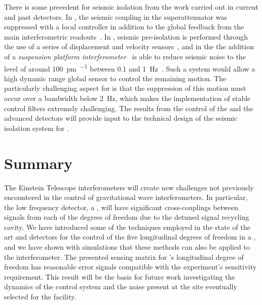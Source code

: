 There is some precedent for seismic isolation from the work carried out in current and past detectors. In \VIRGO{}, the seismic coupling in the superattenuator was suppressed with a local controller in addition to the global feedback from the main interferometric readouts~\cite{Acernese2004}. In \ALIGO{}, seismic pre-isolation is performed through the use of a series of displacement and velocity sensors~\cite{Stochino2009}, and in the \AEIPROTOTYPE{} the addition of a \emph{suspension platform interferometer}~\cite{Gossler2010} is able to reduce seismic noise to the level of around \SI{100}{\pico\meter\per\sqrthz} between \num{0.1} and \SI{1}{\hertz}~\cite{Dahl2010}. Such a system would allow a high dynamic range global sensor to control the remaining motion. The particularly challenging aspect for \ETLF{} is that the suppression of this motion must occur over a bandwidth below \SI{2}{\hertz}, which makes the implementation of stable control filters extremely challenging. The results from the control of the \AEIPROTOTYPE{} and the advanced detectors will provide input to the technical design of the seismic isolation system for \ETLF{}.

\section{Summary}
The Einstein Telescope interferometers will create new challenges not previously encountered in the control of gravitational wave interferometers. In particular, the low frequency \ETLF{} detector, a \DRFPMI{}, will have significant cross-couplings between signals from each of the degrees of freedom due to the detuned signal recycling cavity. We have introduced some of the techniques employed in the state of the art \ALIGO{} and \AVIRGO{} detectors for the control of the five longitudinal degrees of freedom in a \DRFPMI{}, and we have shown with simulations that these methods can also be applied to the \ETLF{} interferometer. The presented sensing matrix for \ETLF{}'s longitudinal degree of freedom has reasonable error signals compatible with the experiment's sensitivity requirement. This result will be the basis for future work investigating the dynamics of the control system and the noise present at the site eventually selected for the facility.